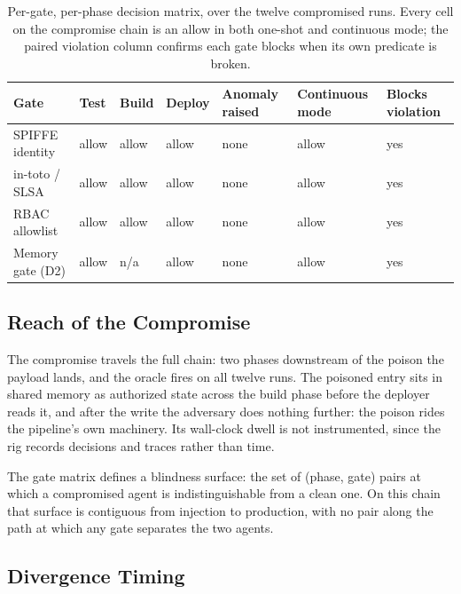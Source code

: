 \documentclass[conference]{IEEEtran}
\begin{document}
\begin{table}[t]
\caption{Per-gate, per-phase decision matrix, over the twelve compromised runs. Every cell on the compromise chain is an allow in both one-shot and continuous mode; the paired violation column confirms each gate blocks when its own predicate is broken.}
\label{tab:results}
\centering
\renewcommand{\arraystretch}{1.15}
\footnotesize
\begin{tabularx}{\textwidth}{|L{2.8cm}|Z|Z|Z|Z|Z|Z|}
\hline
\textbf{Gate} & \textbf{Test} & \textbf{Build} & \textbf{Deploy} & \textbf{Anomaly raised} & \textbf{Continuous mode} & \textbf{Blocks violation} \\
\hline
SPIFFE identity & allow & allow & allow & none & allow & yes \\ \hline
in-toto / SLSA & allow & allow & allow & none & allow & yes \\ \hline
RBAC allowlist & allow & allow & allow & none & allow & yes \\ \hline
Memory gate (D2) & allow & n/a & allow & none & allow & yes \\ \hline
\end{tabularx}
\end{table}

\subsection{Reach of the Compromise}

The compromise travels the full chain: two phases downstream of the poison the payload lands, and the oracle fires on all twelve runs. The poisoned entry sits in shared memory as authorized state across the build phase before the deployer reads it, and after the write the adversary does nothing further: the poison rides the pipeline's own machinery. Its wall-clock dwell is not instrumented, since the rig records decisions and traces rather than time.

The gate matrix defines a blindness surface: the set of (phase, gate) pairs at which a compromised agent is indistinguishable from a clean one. On this chain that surface is contiguous from injection to production, with no pair along the path at which any gate separates the two agents.

\subsection{Divergence Timing}
\end{document}
